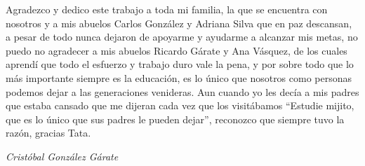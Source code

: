 Agradezco y dedico este trabajo a toda mi familia, la que se encuentra con nosotros y a mis abuelos Carlos González y Adriana Silva que en paz descansan, a pesar de todo nunca dejaron de apoyarme y ayudarme a alcanzar mis metas, no puedo no agradecer a mis abuelos Ricardo Gárate y Ana Vásquez, de los cuales aprendí que todo el esfuerzo y trabajo duro vale la pena, y por sobre todo que lo más importante siempre es la educación, es lo único que nosotros como personas podemos dejar a las generaciones venideras. Aun cuando yo les decía a mis padres que estaba cansado que me dijeran cada vez que los visitábamos “Estudie mijito, que es lo único que sus padres le pueden dejar”, reconozco que siempre tuvo la razón, gracias Tata.

\textit{Cristóbal González Gárate}